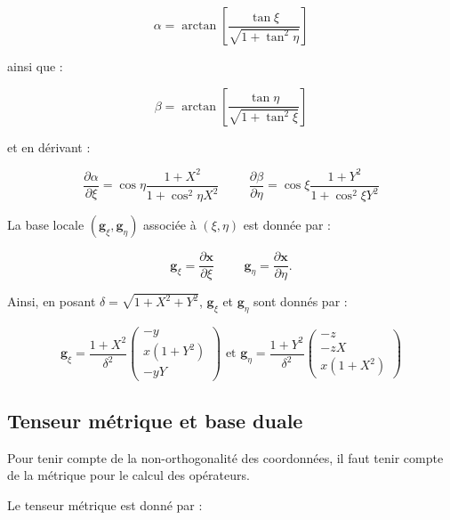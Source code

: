 \begin{equation}
\alpha = \arctan \left[ \dfrac{\tan \xi}{\sqrt{1 + \tan^2 \eta}} \right]
\end{equation}

ainsi que :

\begin{equation}
\beta = \arctan \left[ \dfrac{\tan \eta}{\sqrt{1 + \tan^2 \xi}} \right]
\end{equation}

et en dérivant :

\begin{equation}
\dfrac{\partial \alpha}{\partial \xi} = \cos \eta \dfrac{1+X^2}{1+\cos^2 \eta X^2} \hspace{1cm} \dfrac{\partial \beta}{\partial \eta} = \cos \xi \dfrac{1+Y^2}{1+\cos^2 \xi Y^2}
\end{equation}

La base locale $(\mathbf{g}_{\xi}, \mathbf{g}_{\eta})$ associée à $(\xi,\eta)$ est donnée par :

$$\mathbf{g}_{\xi} = \dfrac{\partial \mathbf{x}}{\partial \xi} \hspace{1cm} \mathbf{g}_{\eta} = \dfrac{\partial \mathbf{x}}{\partial \eta}.$$

Ainsi, en posant $\delta = \sqrt{1+X^2+Y^2}$, $\mathbf{g}_{\xi}$ et $\mathbf{g}_{\eta}$ sont donnés par :

\begin{equation}
\mathbf{g}_{\xi} = \dfrac{1+X^2}{\delta^2} \begin{pmatrix}
-y \\ x(1+Y^2) \\ -yY
\end{pmatrix} \text{ et } \mathbf{g}_{\eta} = \dfrac{1+Y^2}{\delta^2} \begin{pmatrix}
-z \\ -zX \\ x(1+X^2)
\end{pmatrix}
\label{base locale}
\end{equation}

\subsection{Tenseur métrique et base duale}

Pour tenir compte de la non-orthogonalité des coordonnées, il faut tenir compte de la métrique pour le calcul des opérateurs.

Le tenseur métrique est donné par :

